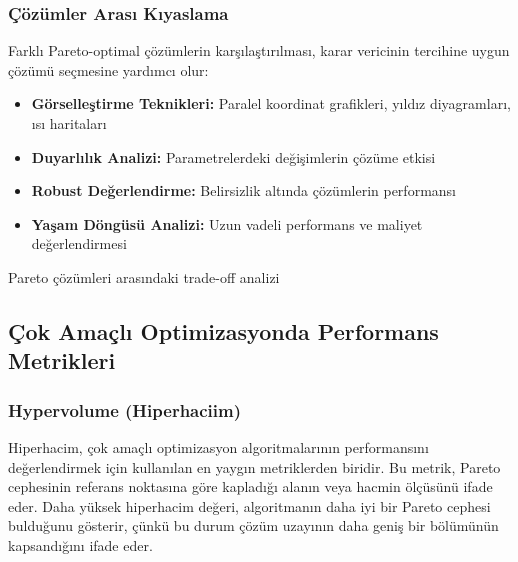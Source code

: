 \subsubsection{Çözümler Arası Kıyaslama}
Farklı Pareto-optimal çözümlerin karşılaştırılması, karar vericinin tercihine uygun çözümü seçmesine yardımcı olur:
\begin{itemize}
    \item \textbf{Görselleştirme Teknikleri:} Paralel koordinat grafikleri, yıldız diyagramları, ısı haritaları
    \item \textbf{Duyarlılık Analizi:} Parametrelerdeki değişimlerin çözüme etkisi
    \item \textbf{Robust Değerlendirme:} Belirsizlik altında çözümlerin performansı
    \item \textbf{Yaşam Döngüsü Analizi:} Uzun vadeli performans ve maliyet değerlendirmesi
\end{itemize}

\begin{marginfigure}
\centering
{}
\caption{Pareto çözümleri arasındaki trade-off analizi}
\end{marginfigure}


\subsection{Çok Amaçlı Optimizasyonda Performans Metrikleri}
\subsubsection{Hypervolume (Hiperhaciim)}
Hiperhacim, çok amaçlı optimizasyon algoritmalarının performansını değerlendirmek için kullanılan en yaygın metriklerden biridir. Bu metrik, Pareto cephesinin referans noktasına göre kapladığı alanın veya hacmin ölçüsünü ifade eder. Daha yüksek hiperhacim değeri, algoritmanın daha iyi bir Pareto cephesi bulduğunu gösterir, çünkü bu durum çözüm uzayının daha geniş bir bölümünün kapsandığını ifade eder.

